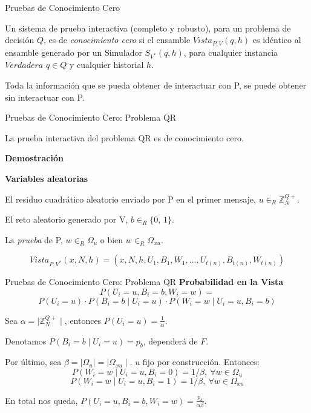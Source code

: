 \documentclass{beamer}
\begin{document}
\begin{frame}{Pruebas de Conocimiento Cero}
	\begin{definition}
		Un sistema de prueba interactiva (completo y robusto), para un problema de decisión $Q$, es de \textit{conocimiento cero} si el ensamble $Vista_{P,V}(q,h)$ es idéntico al ensamble generado por un Simulador $S_{V^*}(q,h)$, para cualquier instancia $Verdadera$ $q\in Q$ y cualquier historial $h$.
	\end{definition}

	Toda la información que se pueda obtener de interactuar con P, se puede obtener sin interactuar con P.
\end{frame}



\begin{frame}{Pruebas de Conocimiento Cero: Problema QR}
	\begin{theorem}
		La prueba interactiva del problema QR es de conocimiento cero.
	\end{theorem}
	\textbf{Demostración}
	
	\textbf{Variables aleatorias}
	\begin{description}[Wi]
		\item[$U_i$] El residuo cuadrático aleatorio enviado por P en el primer mensaje, $u \in_R \mathbb{Z}^{Q+}_N$.
		
		\item[$B_i$] El reto aleatorio generado por V, $b \in_R \{0,\,1\}$.
		
		\item[$W_i$] La \textit{prueba} de P, $w \in_R \Omega_u$ o bien $w \in_R \Omega_{xu}$.
	\end{description}

	\[  Vista_{P,V^*}(x,N,h) = (x,N,h,U_1,B_1,W_1,\dots , U_{t(n)}, B_{t(n)}, W_{t(n)}) \]
\end{frame}

\begin{frame}{Pruebas de Conocimiento Cero: Problema QR}
	\textbf{Probabilidad en la Vista}
	\[
	P(U_i=u, B_i=b, W_i=w) = 
	\]
	\[ P(U_i=u)\cdot P(B_i=b \mid U_i=u) \cdot P(W_i=w \mid U_i=u, B_i=b) \]
	
	Sea $\alpha = \mid \mathbb{Z}^{Q+}_N \mid $, entonces $P(U_i=u) = \frac{1}{\alpha}$.
	
	Denotamos $ P(B_i=b \mid U_i=u)=p_b$, dependerá de $F$.
	
	Por último, sea $\beta = \mid \Omega_u \mid = \mid \Omega_{xu} \mid $. $u$ fijo por construcción. Entonces:
	\[P(W_i=w \mid U_i=u, B_i=0) = 1/\beta,\ \forall w \in \Omega_u\]
	\[P(W_i=w \mid U_i=u, B_i=1) = 1/\beta,\ \forall w \in \Omega_{xu}\]
	
	En total nos queda, $P(U_i=u, B_i=b, W_i=w) = \frac{p_b}{\alpha \beta}$.
\end{frame}
\end{document}
